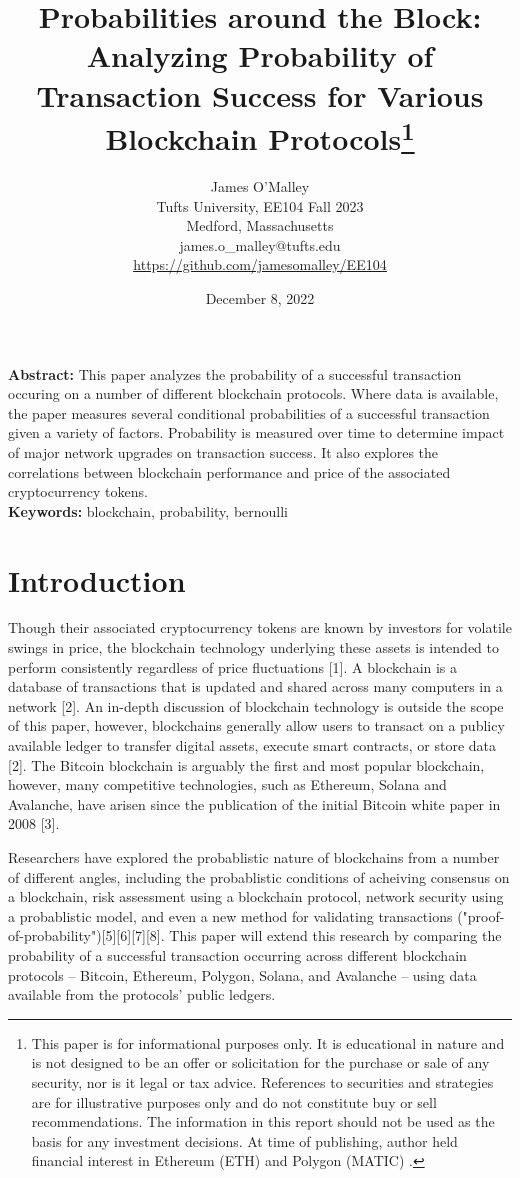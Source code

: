 \documentclass[12pt]{article}
\author{James O'Malley\\
Tufts University, EE104 Fall 2023\\
Medford, Massachusetts\\
james.o\_malley$@$tufts.edu\\
\underline{\href{https://github.com/jamesomalley/EE104}{https://github.com/jamesomalley/EE104}}}
\title{Probabilities around the Block: Analyzing Probability of Transaction Success for Various Blockchain Protocols\footnote{This paper is for informational purposes only. It is educational in nature and is not designed to be an offer or solicitation for the purchase or sale of any security, nor is it legal or tax advice. References to securities and strategies are for illustrative purposes only and do not constitute buy or sell recommendations. The information in this report should not be used as the basis for any investment decisions. At time of publishing, author held financial interest in Ethereum (ETH) and Polygon (MATIC) .}}
\date{December 8, 2022}
\begin{document}
\maketitle

\textbf{Abstract:} This paper analyzes the probability of a successful transaction occuring on a number of different blockchain protocols. Where data is available, the paper measures several conditional probabilities of a successful transaction given a variety of factors. Probability is measured over time to determine impact of major network upgrades on transaction success. It also explores the correlations between blockchain performance and price of the associated cryptocurrency tokens.\\

\textbf{Keywords:} blockchain, probability, bernoulli

\pagebreak

\section{Introduction}

Though their associated cryptocurrency tokens are known by investors for volatile swings in price, the blockchain technology underlying these assets is intended to perform consistently regardless of price fluctuations [1]. A blockchain is a database of transactions that is updated and shared across many computers in a network [2]. 
An in-depth discussion of blockchain technology is outside the scope of this paper, however, blockchains generally allow users to transact on a publicy available ledger to transfer digital assets, execute smart contracts, or store data [2]. The Bitcoin blockchain is arguably the first and most popular blockchain, however, many competitive technologies, such as Ethereum, Solana and Avalanche, have arisen since the publication of the initial Bitcoin white paper in 2008 [3].   

Researchers have explored the probablistic nature of blockchains from a number of different angles, including the probablistic conditions of acheiving consensus on a blockchain, risk assessment using a blockchain protocol, network security using a probablistic model, and even a new method for validating transactions ("proof-of-probability")[5][6][7][8]. This paper will extend this research by comparing the probability of a successful transaction occurring across different blockchain protocols -- Bitcoin, Ethereum, Polygon, Solana, and Avalanche -- using data available from the protocols' public ledgers. 
\end{document}
